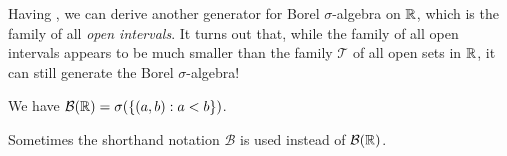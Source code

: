 \begin{enumerate}
Having , we can derive another generator for
Borel \(\sigma\)-algebra on \(\mathbb{R}\), which is the family of all \emph{open
intervals}. It turns out that, while the family of all open intervals appears
to be much smaller than the family \(\mathcal{T}\) of all open sets in \(\mathbb{R}\),
it can still generate the Borel \(\sigma\)-algebra!

\begin{proposition}
\label{prp:borel-r-gen-by-open-int}
We have \(\mathcal{B}(\mathbb{R})=\sigma(\{(a,b):a<b\})\).
\end{proposition}
\begin{note}
Sometimes the shorthand notation \(\mathcal{B}\) is used instead of \(\mathcal{B}(\mathbb{R})\).
\end{note}



\end{enumerate}
